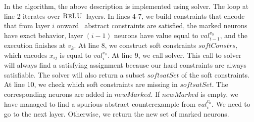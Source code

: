 In the algorithm, the above description is implemented using \maxsat{} solver.
The loop at line 2 iterates over $\textsc{ReLU}${}~layers.
In lines 4-7, we build constraints that encode that from layer $i$ onward
\deeppoly~abstract constraints are satisfied,
the marked neurons have exact behavior, layer $(i-1)$ neurons have value equal to
${val_{i-1}^{v_0}}$, and the execution finishes at $v_k$.
At line 8, we construct soft constraints $softConstrs$, which encodes $x_{ij}$ is equal to $val_{i}^{v_0}$.
At line 9, we call \maxsat{} solver. 
This call to \maxsat{} solver will always find a satisfying assignment because
our hard constraints are always satisfiable.
The solver will also return a subset $softsatSet$ of the soft constraints.
At line 10, we check which soft constraints are missing in $softsatSet$.
The corresponding neurons are added in $newMarked$.
If $newMarked$ is empty, we have managed to find a spurious
abstract counterexample from $val^{v_0}_{i}$.
We need to go to the next layer.
Otherwise, we return the new set of marked neurons.




















